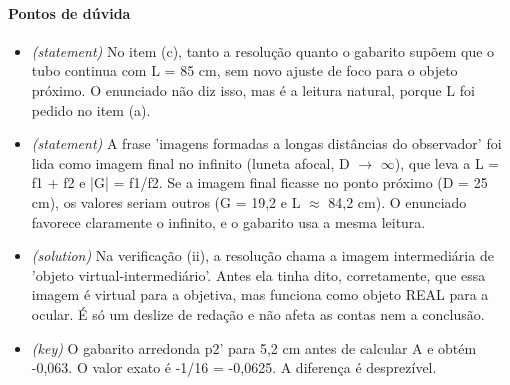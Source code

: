 \documentclass{article}%
\begin{document}
\paragraph{Pontos de dúvida}%
\begin{itemize}%
\item%
\textit{(statement)} No item (c), tanto a resolução quanto o gabarito supõem que o tubo continua com L = 85 cm, sem novo ajuste de foco para o objeto próximo. O enunciado não diz isso, mas é a leitura natural, porque L foi pedido no item (a).%
\item%
\textit{(statement)} A frase 'imagens formadas a longas distâncias do observador' foi lida como imagem final no infinito (luneta afocal, D $\to$ $\infty$), que leva a L = f1 + f2 e |G| = f1/f2. Se a imagem final ficasse no ponto próximo (D = 25 cm), os valores seriam outros (G = 19,2 e L $\approx$ 84,2 cm). O enunciado favorece claramente o infinito, e o gabarito usa a mesma leitura.%
\item%
\textit{(solution)} Na verificação (ii), a resolução chama a imagem intermediária de 'objeto virtual{-}intermediário'. Antes ela tinha dito, corretamente, que essa imagem é virtual para a objetiva, mas funciona como objeto REAL para a ocular. É só um deslize de redação e não afeta as contas nem a conclusão.%
\item%
\textit{(key)} O gabarito arredonda p2' para 5,2 cm antes de calcular A e obtém -0,063. O valor exato é -1/16 = -0,0625. A diferença é desprezível.%
\end{itemize}%
\end{document}
